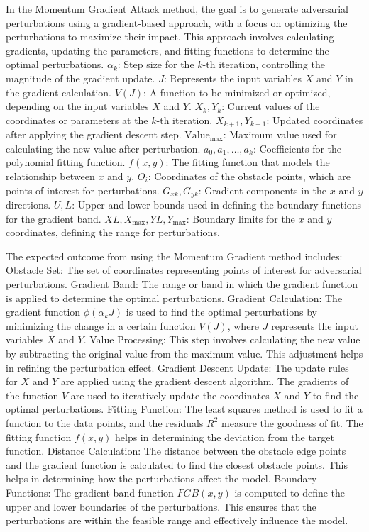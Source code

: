 In the Momentum Gradient Attack method, the goal is to generate adversarial perturbations using a gradient-based approach, with a focus on optimizing the perturbations to maximize their impact. This approach involves calculating gradients, updating the parameters, and fitting functions to determine the optimal perturbations.
$\alpha_k$: Step size for the $k$-th iteration, controlling the magnitude of the gradient update.
$J$: Represents the input variables $X$ and $Y$ in the gradient calculation.
$V(J)$: A function to be minimized or optimized, depending on the input variables $X$ and $Y$.
$X_k, Y_k$: Current values of the coordinates or parameters at the $k$-th iteration.
$X_{k+1}, Y_{k+1}$: Updated coordinates after applying the gradient descent step.
$\text{Value}_{\text{max}}$: Maximum value used for calculating the new value after perturbation.
$a_0, a_1, \ldots, a_k$: Coefficients for the polynomial fitting function.
$f(x, y)$: The fitting function that models the relationship between $x$ and $y$.
$O_i$: Coordinates of the obstacle points, which are points of interest for perturbations.
$G_{xk}, G_{yk}$: Gradient components in the $x$ and $y$ directions.
$U, L$: Upper and lower bounds used in defining the boundary functions for the gradient band.
$XL, X_{\text{max}}, YL, Y_{\text{max}}$: Boundary limits for the $x$ and $y$ coordinates, defining the range for perturbations.


The expected outcome from using the Momentum Gradient method includes:
Obstacle Set: The set of coordinates representing points of interest for adversarial perturbations.
Gradient Band: The range or band in which the gradient function is applied to determine the optimal perturbations. 
Gradient Calculation: The gradient function $\phi(\alpha_k J)$ is used to find the optimal perturbations by minimizing the change in a certain function $V(J)$, where $J$ represents the input variables $X$ and $Y$.
Value Processing: This step involves calculating the new value by subtracting the original value from the maximum value. This adjustment helps in refining the perturbation effect.
Gradient Descent Update: The update rules for $X$ and $Y$ are applied using the gradient descent algorithm. The gradients of the function $V$ are used to iteratively update the coordinates $X$ and $Y$ to find the optimal perturbations.
Fitting Function: The least squares method is used to fit a function to the data points, and the residuals $R^2$ measure the goodness of fit. The fitting function $f(x, y)$ helps in determining the deviation from the target function.
Distance Calculation: The distance between the obstacle edge points and the gradient function is calculated to find the closest obstacle points. This helps in determining how the perturbations affect the model.
Boundary Functions: The gradient band function $FGB(x, y)$ is computed to define the upper and lower boundaries of the perturbations. This ensures that the perturbations are within the feasible range and effectively influence the model.

